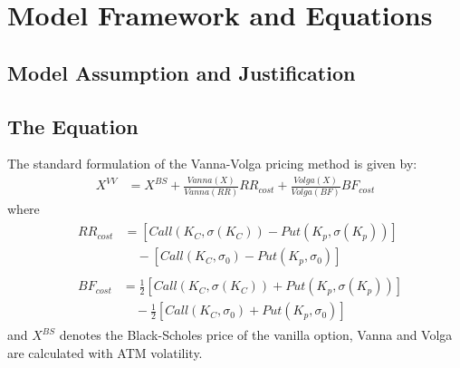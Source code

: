 \section{Model Framework and Equations}
\subsection{Model Assumption and Justification} 

\subsection{The Equation}
The standard formulation of the Vanna-Volga pricing method is given by:
\begin{align}
X^{VV} &= X^{BS} + \frac{Vanna(X)}{Vanna(RR)}RR_{cost}+ \frac{Volga(X)}{Volga(BF)}BF_{cost}
\end{align}
where
\begin{align}
&\begin{aligned}
RR_{cost} &= \left[Call\left( K_C,\sigma\left( K_C\right) \right) -Put\left( K_p,\sigma\left( K_p\right) \right)\right] \\
&\quad - \left[Call\left( K_C,\sigma_0 \right) -Put\left( K_p,\sigma_0 \right)\right]
\end{aligned} \\
&\begin{aligned}
BF_{cost} &= \frac{1}{2} \left[Call\left( K_C,\sigma\left( K_C\right) \right) +Put\left( K_p,\sigma\left( K_p\right) \right)\right] \\
&\quad - \frac{1}{2}\left[Call\left( K_C,\sigma_0 \right) + Put\left( K_p,\sigma_0 \right)\right]
\end{aligned}
\end{align}
and $X^{BS}$ denotes the Black-Scholes price of the vanilla option, Vanna and Volga are calculated with ATM volatility.